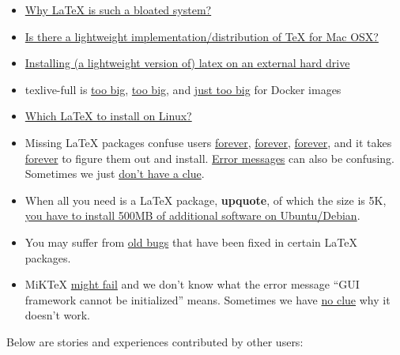 \documentclass[
  xelatex,ja=standard,jafont=noto]{bxjsreport}
\begin{document}
\begin{itemize}
\item
  \href{https://ubuntuforums.org/showthread.php?t=395863}{Why LaTeX is
  such a bloated system?}
\item
  \href{https://tex.stackexchange.com/q/43862/9128}{Is there a
  lightweight implementation/distribution of TeX for Mac OSX?}
\item
  \href{https://tex.stackexchange.com/q/81802/9128}{Installing (a
  lightweight version of) latex on an external hard drive}
\item
  texlive-full is
  \href{https://github.com/rstudio/rticles/pull/130\#issuecomment-313732003}{too
  big}, \href{https://github.com/rocker-org/rocker/issues/266}{too big},
  and \href{https://github.com/road2stat/liftr/issues/25}{just too big}
  for Docker images
\item
  \href{https://tex.stackexchange.com/q/18939/9128}{Which LaTeX to
  install on Linux?}
\item
  Missing LaTeX packages confuse users
  \href{https://github.com/rstudio/rmarkdown/issues/359}{forever},
  \href{https://github.com/rstudio/rmarkdown/issues/1076}{forever},
  \href{https://github.com/rstudio/rmarkdown/issues/1393}{forever}, and
  it takes
  \href{https://twitter.com/xieyihui/status/763805846807547904}{forever}
  to figure them out and install.
  \href{https://stackoverflow.com/q/47400936/559676}{Error messages} can
  also be confusing. Sometimes we just
  \href{https://github.com/rstudio/bookdown/issues/507}{don't have a
  clue}.
\item
  When all you need is a LaTeX package, \textbf{upquote}, of which the
  size is 5K,
  \href{https://github.com/jgm/pandoc/issues/2439\#issuecomment-326518438}{you
  have to install 500MB of additional software on Ubuntu/Debian}.
\item
  You may suffer from
  \href{https://github.com/rstudio/rmarkdown/issues/1505}{old bugs} that
  have been fixed in certain LaTeX packages.
\item
  MiKTeX \href{https://github.com/rstudio/bookdown/issues/531}{might
  fail} and we don't know what the error message ``GUI framework cannot
  be initialized'' means. Sometimes we have
  \href{https://stackoverflow.com/questions/48892499/compile-rmarkdown-document-with-render\#comment84801684_48892499}{no
  clue} why it doesn't work.
\end{itemize}

Below are stories and experiences contributed by other users:
\end{document}
